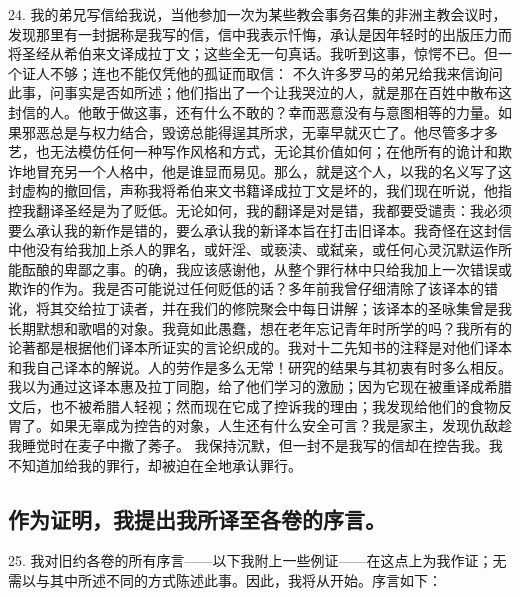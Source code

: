 24. 我的弟兄写信给我说，当他参加一次为某些教会事务召集的非洲主教会议时，发现那里有一封据称是我写的信，信中我表示忏悔，承认是因年轻时的出版压力而将圣经从希伯来文译成拉丁文；这些全无一句真话。我听到这事，惊愕不已。但一个证人不够；连也不能仅凭他的孤证而取信： 不久许多罗马的弟兄给我来信询问此事，问事实是否如所述；他们指出了一个让我哭泣的人，就是那在百姓中散布这封信的人。他敢于做这事，还有什么不敢的？幸而恶意没有与意图相等的力量。如果邪恶总是与权力结合，毁谤总能得逞其所求，无辜早就灭亡了。他尽管多才多艺，也无法模仿任何一种写作风格和方式，无论其价值如何；在他所有的诡计和欺诈地冒充另一个人格中，他是谁显而易见。那么，就是这个人，以我的名义写了这封虚构的撤回信，声称我将希伯来文书籍译成拉丁文是坏的，我们现在听说，他指控我翻译圣经是为了贬低。无论如何，我的翻译是对是错，我都要受谴责：我必须要么承认我的新作是错的，要么承认我的新译本旨在打击旧译本。我奇怪在这封信中他没有给我加上杀人的罪名，或奸淫、或亵渎、或弑亲，或任何心灵沉默运作所能酝酿的卑鄙之事。的确，我应该感谢他，从整个罪行林中只给我加上一次错误或欺诈的作为。我是否可能说过任何贬低的话？多年前我曾仔细清除了该译本的错讹，将其交给拉丁读者，并在我们的修院聚会中每日讲解；该译本的圣咏集曾是我长期默想和歌唱的对象。我竟如此愚蠢，想在老年忘记青年时所学的吗？我所有的论著都是根据他们译本所证实的言论织成的。我对十二先知书的注释是对他们译本和我自己译本的解说。人的劳作是多么无常！研究的结果与其初衷有时多么相反。我以为通过这译本惠及拉丁同胞，给了他们学习的激励；因为它现在被重译成希腊文后，也不被希腊人轻视；然而现在它成了控诉我的理由；我发现给他们的食物反胃了。如果无辜成为控告的对象，人生还有什么安全可言？我是家主，发现仇敌趁我睡觉时在麦子中撒了莠子。 我保持沉默，但一封不是我写的信却在控告我。我不知道加给我的罪行，却被迫在全地承认罪行。\par


\subsection{作为证明，我提出我所译至各卷的序言。}

25. 我对旧约各卷的所有序言——以下我附上一些例证——在这点上为我作证；无需以与其中所述不同的方式陈述此事。因此，我将从开始。序言如下：\par


